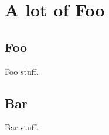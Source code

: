 \documentclass[openany,oneside]{memoir}
\begin{document}
\part{A lot of Foo}
\chapter{Foo}

Foo stuff.

\chapter{Bar}

Bar stuff.
\end{document}

